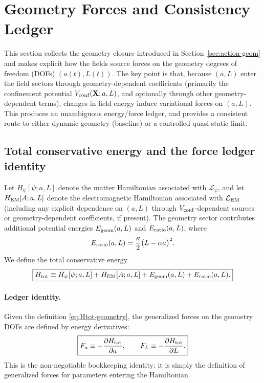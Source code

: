 \documentclass[11pt]{article}
\begin{document}
\section{Geometry Forces and Consistency Ledger}
\label{sec:geometry}

This section collects the geometry closure introduced in Section~\ref{sec:action-geom} and makes explicit how the fields source forces on the geometry degrees of freedom (DOFs) $(a(t),L(t))$. The key point is that, because $(a,L)$ enter the field sectors through geometry-dependent coefficients (primarily the confinement potential $V_{\rm conf}(\mathbf{X};a,L)$, and optionally through other geometry-dependent terms), changes in field energy induce variational forces on $(a,L)$. This produces an unambiguous energy/force ledger, and provides a consistent route to either dynamic geometry (baseline) or a controlled quasi-static limit.

\subsection{Total conservative energy and the force ledger identity}
\label{sec:geometry-ledger}

Let $H_\psi[\psi;a,L]$ denote the matter Hamiltonian associated with $\mathcal L_\psi$, and let $H_{\rm EM}[A;a,L]$ denote the electromagnetic Hamiltonian associated with $\mathcal L_{\rm EM}$ (including any explicit dependence on $(a,L)$ through $V_{\rm conf}$-dependent sources or geometry-dependent coefficients, if present). The geometry sector contributes additional potential energies $E_{\rm geom}(a,L)$ and $E_{\rm ratio}(a,L)$, where
\begin{equation}
E_{\rm ratio}(a,L)=\frac{\kappa}{2}\big(L-\alpha a\big)^2.
\end{equation}
We define the total conservative energy
\begin{equation}
\boxed{
H_{\rm tot} \equiv H_\psi[\psi;a,L] + H_{\rm EM}[A;a,L] + E_{\rm geom}(a,L) + E_{\rm ratio}(a,L).
}
\label{eq:Htot-geometry}
\end{equation}

\paragraph{Ledger identity.}
Given the definition \eqref{eq:Htot-geometry}, the generalized forces on the geometry DOFs are defined by energy derivatives:
\begin{equation}
\boxed{
F_a \equiv -\frac{\partial H_{\rm tot}}{\partial a},
\qquad
F_L \equiv -\frac{\partial H_{\rm tot}}{\partial L}.
}
\label{eq:ledger-forces}
\end{equation}
This is the non-negotiable bookkeeping identity: it is simply the definition of generalized forces for parameters entering the Hamiltonian.
\end{document}
